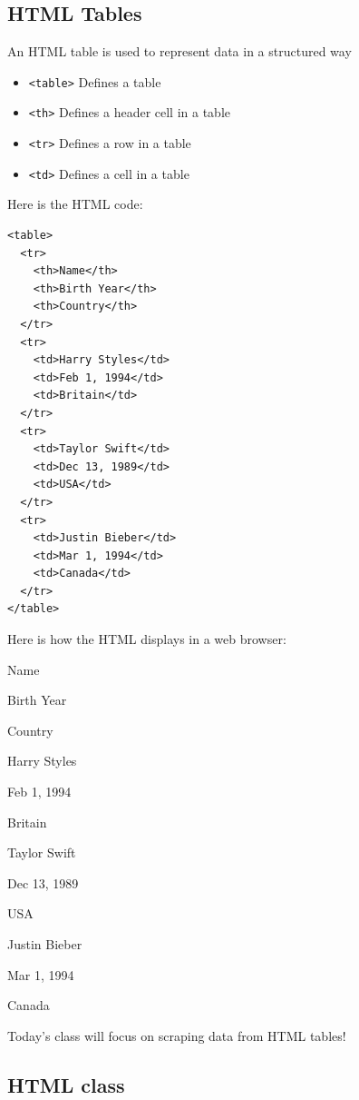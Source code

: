 \documentclass[
  letterpaper,
  DIV=11,
  numbers=noendperiod]{scrartcl}
\providecommand{\tightlist}{%
  \setlength{\itemsep}{0pt}\setlength{\parskip}{0pt}}\usepackage{longtable,booktabs,array}
\begin{document}
\hypertarget{html-tables}{%
\subsection{HTML Tables}\label{html-tables}}

An HTML table is used to represent data in a structured way

\begin{itemize}
\tightlist
\item
  \texttt{\textless{}table\textgreater{}} Defines a table
\item
  \texttt{\textless{}th\textgreater{}} Defines a header cell in a table
\item
  \texttt{\textless{}tr\textgreater{}} Defines a row in a table
\item
  \texttt{\textless{}td\textgreater{}} Defines a cell in a table
\end{itemize}

Here is the HTML code:

\begin{verbatim}
<table>
  <tr>
    <th>Name</th>
    <th>Birth Year</th>  
    <th>Country</th>
  </tr>
  <tr>
    <td>Harry Styles</td>
    <td>Feb 1, 1994</td>
    <td>Britain</td>
  </tr>
  <tr>
    <td>Taylor Swift</td>
    <td>Dec 13, 1989</td>
    <td>USA</td>
  </tr>
  <tr>
    <td>Justin Bieber</td>
    <td>Mar 1, 1994</td>
    <td>Canada</td>
  </tr>
</table>
\end{verbatim}

Here is how the HTML displays in a web browser:

Name

Birth Year

Country

Harry Styles

Feb 1, 1994

Britain

Taylor Swift

Dec 13, 1989

USA

Justin Bieber

Mar 1, 1994

Canada

Today's class will focus on scraping data from HTML tables!

\hypertarget{html-class}{%
\subsection{HTML class}\label{html-class}}
\end{document}
